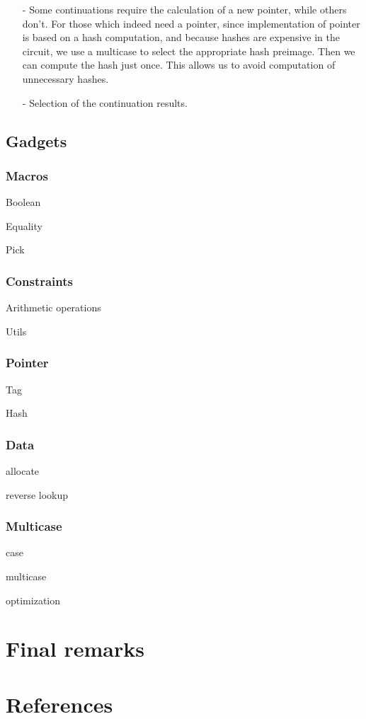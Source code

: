 \documentclass[10pt, english]{article}
\begin{document}
\begin{itemize}
	\item[-] Some continuations require the calculation of a new pointer, while others don't. For those which indeed need a pointer, since implementation of pointer is based on a hash computation, and because hashes are expensive in the circuit, we use a multicase to select the appropriate hash preimage. Then we can compute the hash just once. This allows us to avoid computation of unnecessary hashes.
	\item[-] Selection of the continuation results.
\end{itemize}


\subsection{Gadgets}

\subsubsection{Macros}

Boolean

Equality

Pick

\subsubsection{Constraints}

Arithmetic operations

Utils

\subsubsection{Pointer}

Tag

Hash

\subsubsection{Data}

allocate

reverse lookup

\subsubsection{Multicase}

case

multicase

optimization


\section{Final remarks}

\section{References}




\end{document}
